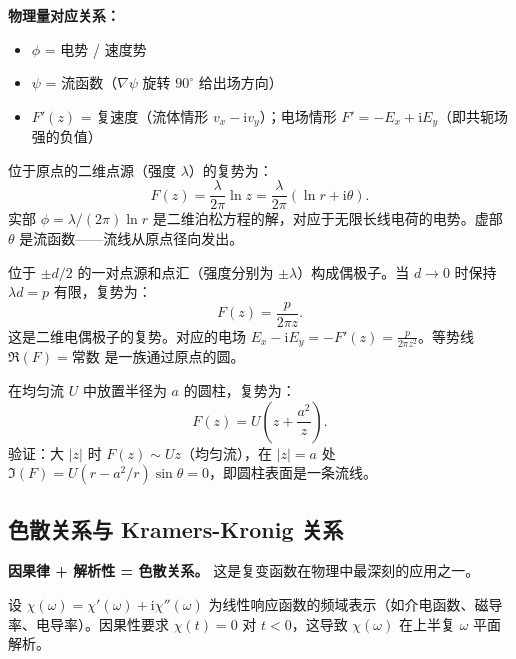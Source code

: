 \textbf{物理量对应关系：}
\begin{itemize}
\item $\phi$ = 电势 / 速度势
\item $\psi$ = 流函数（$\nabla\psi$ 旋转 $90^\circ$ 给出场方向）
\item $F'(z)$ = 复速度（流体情形 $v_x-\mathrm{i}v_y$）；电场情形 $F' = -E_x+\mathrm{i}E_y$（即共轭场强的负值）
\end{itemize}

\begin{example}[点源的复势]
位于原点的二维点源（强度 $\lambda$）的复势为：
\begin{equation}
F(z) = \frac{\lambda}{2\pi}\ln z
= \frac{\lambda}{2\pi}(\ln r + \mathrm{i}\theta).
\end{equation}
实部 $\phi = \lambda/(2\pi)\ln r$ 是二维泊松方程的解，对应于无限长线电荷的电势。虚部 $\theta$ 是流函数——流线从原点径向发出。
\end{example}

\begin{example}[电偶极子的复势]
位于 $\pm d/2$ 的一对点源和点汇（强度分别为 $\pm\lambda$）构成偶极子。当 $d\to0$ 时保持 $\lambda d = p$ 有限，复势为：
\begin{equation}
F(z) = \frac{p}{2\pi z}.
\end{equation}
这是二维电偶极子的复势。对应的电场 $E_x - \mathrm{i}E_y = -F'(z) = \frac{p}{2\pi z^2}$。等势线 $\Re(F) = \text{常数}$ 是一族通过原点的圆。
\end{example}

\begin{example}[均匀流绕圆柱]
在均匀流 $U$ 中放置半径为 $a$ 的圆柱，复势为：
\begin{equation}
F(z) = U\left(z + \frac{a^2}{z}\right).
\end{equation}
验证：大 $|z|$ 时 $F(z) \sim Uz$（均匀流），在 $|z|=a$ 处 $\Im(F) = U(r - a^2/r)\sin\theta = 0$，即圆柱表面是一条流线。
\end{example}

\subsection{色散关系与 Kramers-Kronig 关系}

\textbf{因果律 + 解析性 = 色散关系。} 这是复变函数在物理中最深刻的应用之一。

设 $\chi(\omega) = \chi'(\omega) + \mathrm{i}\chi''(\omega)$ 为线性响应函数的频域表示（如介电函数、磁导率、电导率）。因果性要求 $\chi(t)=0$ 对 $t<0$，这导致 $\chi(\omega)$ 在上半复 $\omega$ 平面解析。


